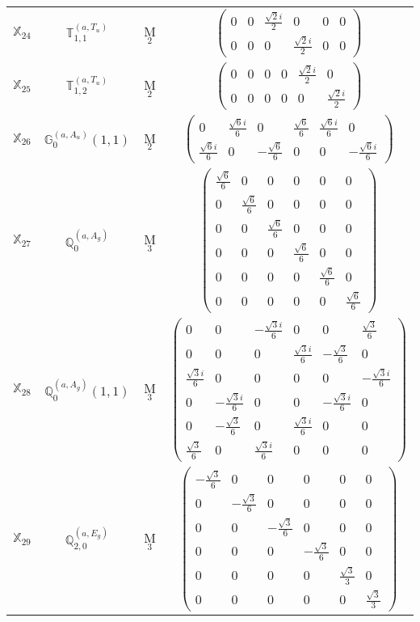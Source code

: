 \documentclass[fleqn,10pt,landscape]{article}
\begin{document}
\begin{itemize}
\begin{center}
\begin{longtable}{c|c|c|c}
$ \mathbb{X}_{24} $ & $\mathbb{T}_{1,1}^{(a,T_{u})}$ & M$_{2}$ & $\begin{pmatrix} 0 & 0 & \frac{\sqrt{2} i}{2} & 0 & 0 & 0 \\ 0 & 0 & 0 & \frac{\sqrt{2} i}{2} & 0 & 0 \end{pmatrix}$ \\
$ \mathbb{X}_{25} $ & $\mathbb{T}_{1,2}^{(a,T_{u})}$ & M$_{2}$ & $\begin{pmatrix} 0 & 0 & 0 & 0 & \frac{\sqrt{2} i}{2} & 0 \\ 0 & 0 & 0 & 0 & 0 & \frac{\sqrt{2} i}{2} \end{pmatrix}$ \\
$ \mathbb{X}_{26} $ & $\mathbb{G}_{0}^{(a,A_{u})}(1,1)$ & M$_{2}$ & $\begin{pmatrix} 0 & \frac{\sqrt{6} i}{6} & 0 & \frac{\sqrt{6}}{6} & \frac{\sqrt{6} i}{6} & 0 \\ \frac{\sqrt{6} i}{6} & 0 & - \frac{\sqrt{6}}{6} & 0 & 0 & - \frac{\sqrt{6} i}{6} \end{pmatrix}$ \\ \hline
$ \mathbb{X}_{27} $ & $\mathbb{Q}_{0}^{(a,A_{g})}$ & M$_{3}$ & $\begin{pmatrix} \frac{\sqrt{6}}{6} & 0 & 0 & 0 & 0 & 0 \\ 0 & \frac{\sqrt{6}}{6} & 0 & 0 & 0 & 0 \\ 0 & 0 & \frac{\sqrt{6}}{6} & 0 & 0 & 0 \\ 0 & 0 & 0 & \frac{\sqrt{6}}{6} & 0 & 0 \\ 0 & 0 & 0 & 0 & \frac{\sqrt{6}}{6} & 0 \\ 0 & 0 & 0 & 0 & 0 & \frac{\sqrt{6}}{6} \end{pmatrix}$ \\
$ \mathbb{X}_{28} $ & $\mathbb{Q}_{0}^{(a,A_{g})}(1,1)$ & M$_{3}$ & $\begin{pmatrix} 0 & 0 & - \frac{\sqrt{3} i}{6} & 0 & 0 & \frac{\sqrt{3}}{6} \\ 0 & 0 & 0 & \frac{\sqrt{3} i}{6} & - \frac{\sqrt{3}}{6} & 0 \\ \frac{\sqrt{3} i}{6} & 0 & 0 & 0 & 0 & - \frac{\sqrt{3} i}{6} \\ 0 & - \frac{\sqrt{3} i}{6} & 0 & 0 & - \frac{\sqrt{3} i}{6} & 0 \\ 0 & - \frac{\sqrt{3}}{6} & 0 & \frac{\sqrt{3} i}{6} & 0 & 0 \\ \frac{\sqrt{3}}{6} & 0 & \frac{\sqrt{3} i}{6} & 0 & 0 & 0 \end{pmatrix}$ \\
$ \mathbb{X}_{29} $ & $\mathbb{Q}_{2,0}^{(a,E_{g})}$ & M$_{3}$ & $\begin{pmatrix} - \frac{\sqrt{3}}{6} & 0 & 0 & 0 & 0 & 0 \\ 0 & - \frac{\sqrt{3}}{6} & 0 & 0 & 0 & 0 \\ 0 & 0 & - \frac{\sqrt{3}}{6} & 0 & 0 & 0 \\ 0 & 0 & 0 & - \frac{\sqrt{3}}{6} & 0 & 0 \\ 0 & 0 & 0 & 0 & \frac{\sqrt{3}}{3} & 0 \\ 0 & 0 & 0 & 0 & 0 & \frac{\sqrt{3}}{3} \end{pmatrix}$ \\

\end{longtable}
\end{center}
\end{itemize}
\end{document}
